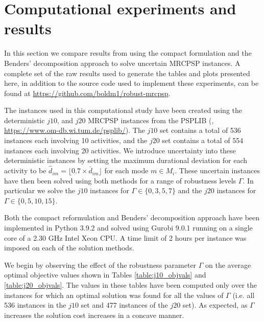 \documentclass[a4paper,abstracton]{scrartcl}
\begin{document}
\section{Computational experiments and results} \label{section:experiments}
 
In this section we compare results from using the compact formulation and the Benders' decomposition approach to solve uncertain MRCPSP instances. A complete set of the raw results used to generate the tables and plots presented here, in addition to the source code used to implement these experiments, can be found at \url{https://github.com/boldm1/robust-mrcpsp}.

The instances used in this computational study have been created using the deterministic $j10$, and $j20$ MRCPSP instances from the PSPLIB (\cite{kolisch1997psplib}, \url{https://www.om-db.wi.tum.de/psplib/}). The $j10$ set contains a total of 536 instances each involving 10 activities, and the $j20$ set contains a total of 554 instances each involving 20 activities. We introduce uncertainty into these deterministic instances by setting the maximum durational deviation for each activity to be $\hat{d}_{im}=\lfloor0.7\times \bar{d}_{im}\rfloor$ for each mode $m\in M_i$. These uncertain instances have then been solved using both methods for a range of robustness levels $\Gamma$. In particular we solve the $j10$ instances for $\Gamma\in\{0,3,5,7\}$ and the $j20$ instances for $\Gamma\in\{0,5,10,15\}$. 

Both the compact reformulation and Benders' decomposition approach have been implemented in Python 3.9.2 and solved using Gurobi 9.0.1 running on a single core of a 2.30 GHz Intel Xeon CPU. A time limit of 2 hours per instance was imposed on each of the solution methods.

We begin by observing the effect of the robustness parameter $\Gamma$ on the average optimal objective values shown in Tables \ref{table:j10_objvals} and \ref{table:j20_objvals}. The values in these tables have been computed only over the instances for which an optimal solution was found for all the values of $\Gamma$ (i.e. all 536 instances in the $j10$ set and 477 instances of the $j20$ set). As expected, as $\Gamma$ increases the solution cost increases in a concave manner. 
\end{document}
